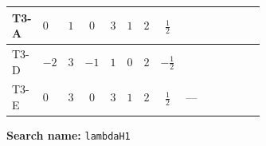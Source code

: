 \documentclass[8pt]{article}
\begin{document}
\begin{landscape}
\begin{longtable}{@{}llcccccc >{\raggedright\arraybackslash}p{0.21\linewidth} >{\raggedright\arraybackslash}p{0.21\linewidth} >{\raggedright\arraybackslash}p{0.21\linewidth}@{}}
\midrule
T3-A & $0$ & $1$ & $0$ & $3$ & $1$ & $2$ & $\frac{1}{2}$ & \scriptsize\adjustbox{max width=\linewidth}{$\begin{gathered} +6 {\lambda_{12}} {\lambda_{H2}}\end{gathered}$} & \scriptsize\adjustbox{max width=\linewidth}{$\begin{gathered} +6 {\lambda_H} {\lambda_{H1}}\end{gathered}$} & \scriptsize\adjustbox{max width=\linewidth}{$\begin{gathered} +4 {\lambda_{H1}}^2\end{gathered}$} \\
\midrule
T3-D & $-2$ & $3$ & $-1$ & $1$ & $0$ & $2$ & $-\frac{1}{2}$ & \scriptsize\adjustbox{max width=\linewidth}{$\begin{gathered} +2 {\lambda_{12}} {\lambda_{H2}}\end{gathered}$} & \scriptsize\adjustbox{max width=\linewidth}{$\begin{gathered} +6 {\lambda_H} {\lambda_{H1}}\end{gathered}$} & \scriptsize\adjustbox{max width=\linewidth}{$\begin{gathered} +4 {\lambda_{H1}}^2\end{gathered}$} \\
\midrule
T3-E & $0$ & $3$ & $0$ & $3$ & $1$ & $2$ & $\frac{1}{2}$ & --- & \scriptsize\adjustbox{max width=\linewidth}{$\begin{gathered} +6 {\lambda_H} {\lambda_{H1}}\end{gathered}$} & \scriptsize\adjustbox{max width=\linewidth}{$\begin{gathered} +4 {\lambda_{H1}}^2\end{gathered}$} \\
\midrule
\bottomrule
\end{longtable}
\clearpage
\noindent\textbf{Search name: }\texttt{lambdaH1}\par\smallskip

\end{landscape}
\end{document}
